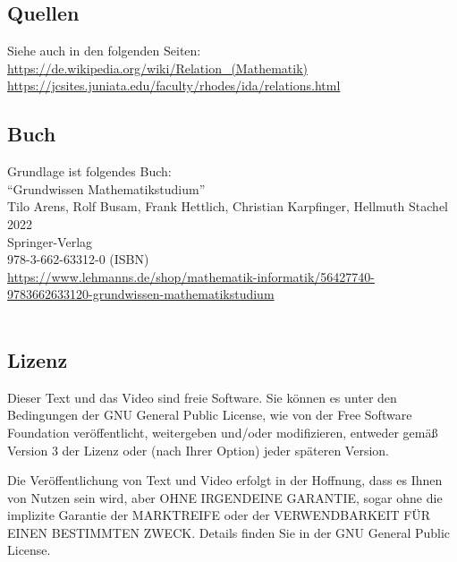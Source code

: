 \documentclass[a4paper]{amsart}
\theoremstyle{definition}
\begin{document}
\subsection*{Quellen}
Siehe auch in den folgenden Seiten:\\
\url{https://de.wikipedia.org/wiki/Relation_(Mathematik)}\\
\url{https://jcsites.juniata.edu/faculty/rhodes/ida/relations.html}

\subsection*{Buch}
Grundlage ist folgendes Buch:\\
"`Grundwissen Mathematikstudium"'\\
Tilo Arens, Rolf Busam, Frank Hettlich, Christian Karpfinger, Hellmuth Stachel \\
2022\\
Springer-Verlag\\
978-3-662-63312-0 (ISBN)\\
{\tiny
   \url{https://www.lehmanns.de/shop/mathematik-informatik/56427740-9783662633120-grundwissen-mathematikstudium}}\\
\\

\subsection*{Lizenz}
Dieser Text und das Video sind freie Software. Sie können es unter den Bedingungen der 
GNU General Public License, wie von der Free Software Foundation veröffentlicht, weitergeben 
und/oder modifizieren, entweder gemäß Version 3 der Lizenz oder (nach Ihrer Option) jeder späteren Version.

Die Veröffentlichung von Text und Video erfolgt in der Hoffnung, dass es Ihnen von Nutzen sein wird, 
aber OHNE IRGENDEINE GARANTIE, sogar ohne die implizite Garantie der MARKTREIFE oder der 
VERWENDBARKEIT FÜR EINEN BESTIMMTEN ZWECK. Details finden Sie in der GNU General Public License.
\end{document}
